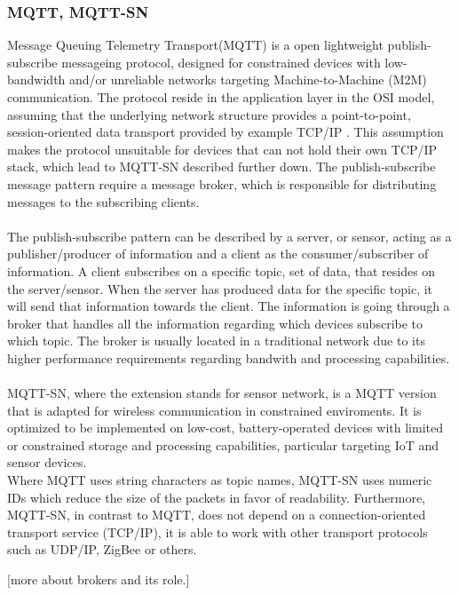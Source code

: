 \subsubsection{MQTT, MQTT-SN}
Message Queuing Telemetry Transport(MQTT) is a open lightweight publish-subscribe messageing protocol, designed for constrained devices with low-bandwidth and/or unreliable networks targeting Machine-to-Machine (M2M) communication\cite{mqtt}. The protocol reside in the application layer in the OSI model, assuming that the underlying network structure provides a point-to-point, session-oriented data transport provided by example TCP/IP \cite{hunkeler2008mqtt}. This assumption makes the protocol unsuitable for devices that can not hold their own TCP/IP stack, which lead to MQTT-SN described further down. The publish-subscribe message pattern require a message broker, which is responsible for distributing messages to the subscribing clients.
\\\\
The publish-subscribe pattern can be described by a server, or sensor, acting as a publisher/producer of information and a client as the consumer/subscriber of information. A client subscribes on a specific topic, set of data, that resides on the server/sensor. When the server has produced data for the specific topic, it will send that information towards the client. 
The information is going through a broker that handles all the information regarding which devices subscribe to which topic. The broker is usually located in a traditional network due to its higher performance requirements regarding bandwith and processing capabilities.\\\\
MQTT-SN, where the extension stands for sensor network, is a MQTT version that is adapted for wireless communication in constrained enviroments. It is optimized to be implemented on low-cost, battery-operated devices with limited or constrained storage and processing capabilities\cite{MQTT-SN}, particular targeting IoT and sensor devices.\\
Where MQTT uses string characters as topic names, MQTT-SN uses numeric IDs which reduce the size of the packets in favor of readability. Furthermore, MQTT-SN, in contrast to MQTT, does not depend on a connection-oriented transport service (TCP/IP), it is able to work with other transport protocols such as UDP/IP, ZigBee or others. 

[more about brokers and its role.]

